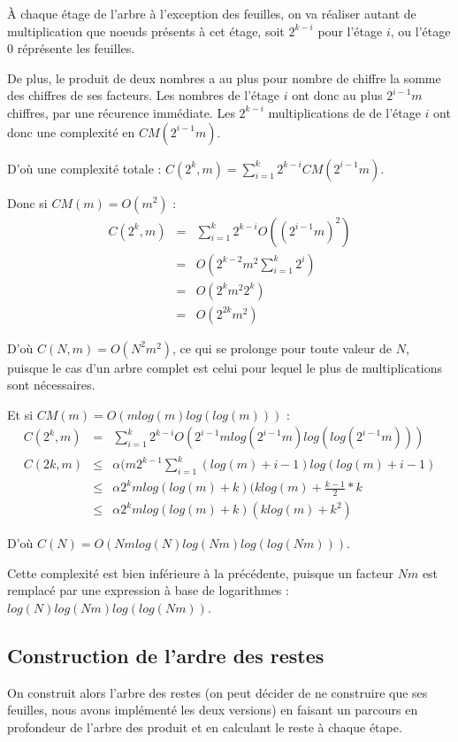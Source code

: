 \documentclass[a4paper,10pt]{article}
\begin{document}
  À chaque étage de l'arbre à l'exception des feuilles, on va réaliser autant de multiplication que noeuds présents à cet étage, soit $2^{k-i}$ pour l'étage $i$, ou l'étage $0$ réprésente les feuilles.
  
  De plus, le produit de deux nombres a au plus pour nombre de chiffre la somme des chiffres de ses facteurs.
  Les nombres de l'étage $i$ ont donc au plus $2^{i-1}m$ chiffres, par une récurence immédiate.
  Les $2^{k-i}$ multiplications de de l'étage $i$ ont donc une complexité en $CM(2^{i-1}m)$.
  
  D'où une complexité totale : $C(2^k,m) = \sum_{i=1}^k 2^{k-i}CM(2^{i-1}m)$.
  
  Donc si $CM(m) = O(m^2)$ :
  \begin{eqnarray*}
   C(2^k,m) &=& \sum_{i=1}^k 2^{k-i}O((2^{i-1}m)^2)\\
   &=& O(2^{k-2}m^2\sum_{i=1}^k 2^i)\\
   &=& O(2^k m^2 2^k)\\
   &=& O(2^{2k} m^2)
  \end{eqnarray*}
  
  D'où $C(N,m) = O(N^2m^2)$, ce qui se prolonge pour toute valeur de $N$, puisque le cas d'un arbre complet est celui pour lequel le plus de multiplications sont nécessaires.
  
  Et si $CM(m) = O(mlog(m)log(log(m)))$ :
  \begin{eqnarray*}
   C(2^k,m) &=& \sum_{i=1}^k 2^{k-i}O(2^{i-1}mlog(2^{i-1}m)log(log(2^{i-1}m)))\\
   C(2k,m) &\leq& \alpha(m2^{k-1}\sum_{i=1}^k(log(m)+i-1)log(log(m)+i-1)\\
   &\leq& \alpha 2^k m log(log(m)+k)(k log(m) + \frac{k-1}{2}*k\\
   &\leq& \alpha 2^k m log(log(m)+k)(klog(m)+k^2)
  \end{eqnarray*}
  
  D'où $C(N) = O(Nmlog(N)log(Nm)log(log(Nm)))$.
  
  Cette complexité est bien inférieure à la précédente, puisque un facteur $Nm$ est remplacé par une expression à base de logarithmes : $log(N)log(Nm)log(log(Nm))$.


  \subsection{Construction de l'ardre des restes}
  On construit alors l'arbre des restes (on peut décider de ne construire que ses feuilles, nous avons implémenté les deux versions) en faisant un parcours en profondeur de l'arbre des produit et en calculant le reste à chaque étape.
  
\end{document}
